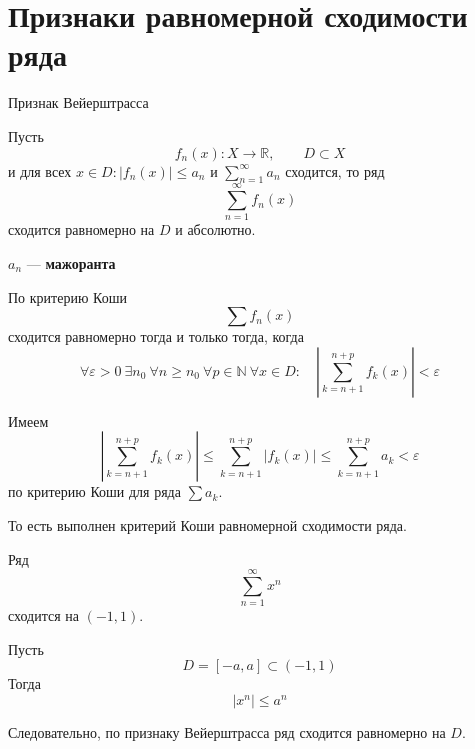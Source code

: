 \documentclass[12pt,a4paper]{article}
\begin{document}
\newpage

\section{Признаки равномерной сходимости ряда}

\begin{theorem}{Признак Вейерштрасса}

    Пусть
    \[
        f_n(x)\colon X\to\mathbb{R},
        \qquad
        D\subset X
    \]
    и для всех $x\in D: |f_n(x)|\leq a_n \text{ и } \sum_{n=1}^{\infty}a_n$ сходится, то ряд
    \[
        \sum_{n=1}^{\infty}f_n(x)
    \]
    сходится равномерно на $D$ и абсолютно.

    $a_n$ --- \textbf{мажоранта}

\end{theorem}

\begin{proofbox}{}

    По критерию Коши
    \[
        \sum f_n(x)
    \]
    сходится равномерно тогда и только тогда, когда
    \[
        \forall\varepsilon>0\ \exists n_0\
        \forall n\geq n_0\
        \forall p\in\mathbb{N}\
        \forall x\in D:
        \quad
        \left|
        \sum_{k=n+1}^{n+p}f_k(x)
        \right|<\varepsilon
    \]

    Имеем
    \[
        \left|
        \sum_{k=n+1}^{n+p}f_k(x)
        \right|
        \leq
        \sum_{k=n+1}^{n+p}|f_k(x)|
        \leq
        \sum_{k=n+1}^{n+p}a_k
        <\varepsilon
    \]
    по критерию Коши для ряда $\sum a_k$.

    То есть выполнен критерий Коши равномерной сходимости ряда.

\end{proofbox}

\begin{example}

    Ряд
    \[
        \sum_{n=1}^{\infty}x^n
    \]
    сходится на $(-1,1)$.

    Пусть
    \[
        D=[-a,a]\subset(-1,1)
    \]
    Тогда
    \[
        |x^n|\leq a^n
    \]

    Следовательно, по признаку Вейерштрасса ряд сходится равномерно на $D$.

\end{example}
\end{document}

